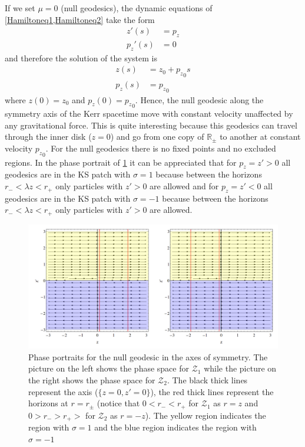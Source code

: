 If we set $\mu=0$ (null geodesics), the dynamic equations of \cref{Hamiltoneq1,Hamiltoneq2} take the form
\begin{align}
 z'(s)&= p_z  \\
 p_z'(s)&=0
\end{align}
and therefore the solution of the system is
\begin{align}
 z(s)&=z_0 +{p_z}_0 s \\
 p_z(s)&={p_z}_0
\end{align}
where $z(0)=z_0$ and $p_z(0)={p_z}_0$. Hence, the null geodesic along the symmetry axis of the Kerr spacetime move with constant velocity unaffected by any gravitational force. This is quite interesting because this geodesics can travel through the inner disk ($z=0$) and go from one copy of $\mathbb{R}_\pm$ to another at constant velocity ${p_z}_0$. For the null geodesics there is no fixed points and no excluded regions. In the phase portrait of \cref{fig:photons} it can be appreciated that for $p_z=z'>0$ all geodesics are in the \gls{KS} patch with $\sigma=1$ because between the horizons $r_-< \lambda z < r_+$ only particles with $z'>0$ are allowed and for $p_z=z'<0$ all geodesics are in the \gls{KS} patch with $\sigma=-1$ because between the horizons $r_-< \lambda z < r_+$ only particles with $z'>0$ are allowed.

 \begin{figure}[hpt!]  
\begin{center}
 \centerline{\includegraphics[width=\textwidth]{img/Chapter3/photonsps.png}}
 \end{center}
 \caption{Phase portraits for the null geodesic in the axes of symmetry. The picture on the left shows the phase space for $\mathcal{Z}_1$ while the picture on the right shows the phase space for  $\mathcal{Z}_2$. The black thick lines represent the axis ($\{z=0,z'=0\}$), the red thick lines represent the horizons at $r=r_\pm$ (notice that $0<r_-<r_+$ for $\mathcal{Z}_1$ as $r=z$ and $0>r_->r_+>$ for $\mathcal{Z}_2$ as $r=-z$). The yellow region indicates the region with $\sigma=1$ and the blue region indicates the region with $\sigma=-1$}
 \label{fig:photons}
\end{figure}  


